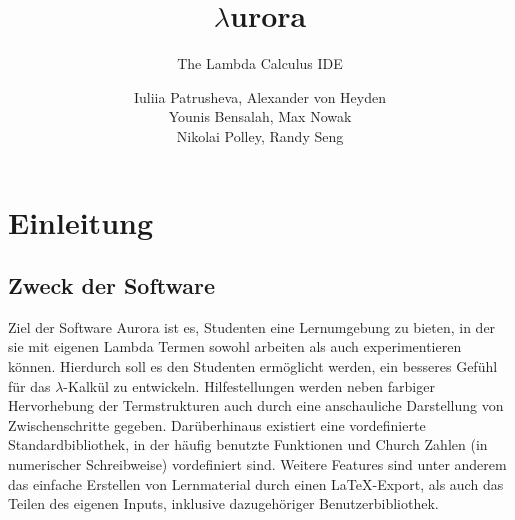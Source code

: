 \documentclass[parskip=full,11pt,twoside]{scrbook}
\title{$\lambda$urora}
\subtitle{The Lambda Calculus IDE}
\author{Iuliia Patrusheva, Alexander von Heyden\\
Younis Bensalah, Max Nowak\\
Nikolai Polley, Randy Seng}
\begin{document}
\maketitle
\pagebreak
\setcounter{tocdepth}{4}
\tableofcontents

\newpage
\section{Einleitung}
\subsection{Zweck der Software}
Ziel der Software Aurora ist es, Studenten eine Lernumgebung zu bieten, in der sie mit eigenen Lambda Termen sowohl arbeiten als auch experimentieren können.
Hierdurch soll es den Studenten ermöglicht werden, ein besseres Gefühl für das $\lambda$-Kalkül zu entwickeln.
Hilfestellungen werden neben farbiger Hervorhebung der Termstrukturen auch durch eine anschauliche Darstellung von Zwischenschritte gegeben.
Darüberhinaus existiert eine vordefinierte Standardbibliothek, in der häufig benutzte Funktionen und Church Zahlen (in numerischer Schreibweise) vordefiniert sind.
\newline
Weitere Features sind unter anderem das einfache Erstellen von Lernmaterial durch einen \LaTeX-Export, als auch das Teilen des eigenen Inputs, inklusive dazugehöriger Benutzerbibliothek.
\end{document}
